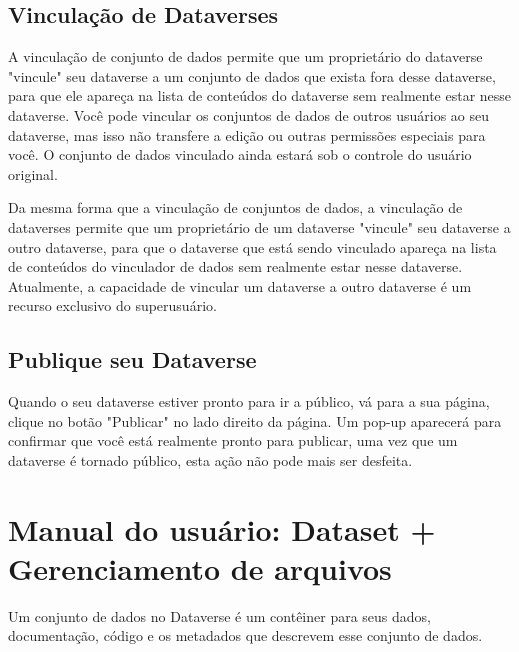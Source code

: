 \documentclass[12pt,hidelinks]{article}
\begin{document}
    \subsection{Vinculação de Dataverses}
    
\qquad A vinculação de conjunto de dados permite que um proprietário do dataverse "vincule" seu dataverse a um conjunto de dados que exista fora desse dataverse, para que ele apareça na lista de conteúdos do dataverse sem realmente estar nesse dataverse. Você pode vincular os conjuntos de dados de outros usuários ao seu dataverse, mas isso não transfere a edição ou outras permissões especiais para você. O conjunto de dados vinculado ainda estará sob o controle do usuário original.

Da mesma forma que a vinculação de conjuntos de dados, a vinculação de dataverses permite que um proprietário de um dataverse "vincule" seu dataverse a outro dataverse, para que o dataverse que está sendo vinculado apareça na lista de conteúdos do vinculador de dados sem realmente estar nesse dataverse. Atualmente, a capacidade de vincular um dataverse a outro dataverse é um recurso exclusivo do superusuário.

    \subsection{Publique seu Dataverse}
    
\qquad Quando o seu dataverse estiver pronto para ir a público, vá para a sua página, clique no botão "Publicar" no lado direito da página. Um pop-up aparecerá para confirmar que você está realmente pronto para publicar, uma vez que um dataverse é tornado público, esta ação não pode mais ser desfeita.

\newpage

\section{Manual do usuário: Dataset + Gerenciamento de arquivos}
\vspace{10.0cm}

\qquad Um conjunto de dados no Dataverse é um contêiner para seus dados, documentação, código e os metadados que descrevem esse conjunto de dados.
\end{document}
